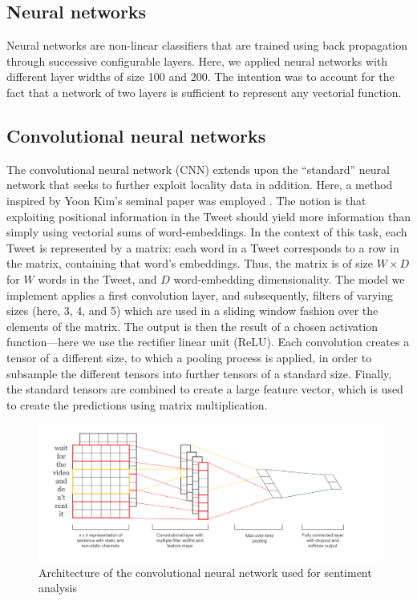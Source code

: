 \subsection{Neural networks}
Neural networks are non-linear classifiers that are trained using back propagation through successive configurable layers. Here, we applied neural networks with different layer widths of size 100 and 200. The intention was to account for the fact that a network of two layers is sufficient to represent any vectorial function.

\subsection{Convolutional neural networks}
The convolutional neural network (CNN) extends upon the ``standard'' neural network that seeks to further exploit locality data in addition. Here, a method inspired by Yoon Kim's seminal paper was employed \cite{cnnYoon}. The notion is that exploiting positional information in the Tweet should yield more information than simply using vectorial sums of word-embeddings.
In the context of this task, each Tweet is represented by a matrix: each word in a Tweet corresponds to a row in the matrix, containing that word's embeddings. Thus, the matrix is of size $W \times D$ for $W$ words in the Tweet, and $D$ word-embedding dimensionality.
The model we implement applies a first convolution layer, and subsequently, filters of varying sizes (here, 3, 4, and 5) which are used in a sliding window fashion over the elements of the matrix. The output is then the result of a chosen activation function---here we use the rectifier linear unit (ReLU). Each convolution creates a tensor of a different size, to which a pooling process is applied, in order to subsample the different tensors into further tensors of a standard size. Finally, the standard tensors are combined to create a large feature vector, which is used to create the predictions using matrix multiplication.

\begin{figure}[h!]
\centering
	\includegraphics[scale=0.2]{CNN} 
\caption{Architecture of the convolutional neural network used for sentiment analysis \cite{cnnYoon}}
\label{plot:CNN}
\end{figure}
\FloatBarrier

